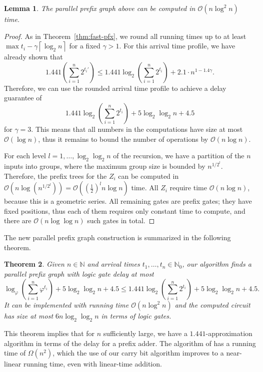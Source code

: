 \documentclass[11pt,final,microtype]{scrartcl}
\theoremstyle{plain}
\newtheorem{theorem}{Theorem}[section]
\newtheorem{lemma}[theorem]{Lemma}
\theoremstyle{definition}
\theoremstyle{remark}
\newcommand{\ceil}[1]{\left\lceil #1 \right\rceil}
\newcommand{\ld}{\log_{2}}
\begin{document}
\begin{lemma} \label{lem:rt-app}
  The parallel prefix graph above can be
  computed in $\mathcal{O}(n \log^2 n)$ time. 
\end{lemma}
\begin{proof}
  As in Theorem~\ref{thm:fast-pfx}, we round all running times up to
  at least $\max t_i - \gamma \ceil{\ld n}$ for a fixed $\gamma >
  1$. For this arrival time profile, we have already shown that
  $$1.441\left(\sum_{i=1}^n 2^{t_i'}\right)  \leq  1.441 \ld
  \left(\sum_{i=1}^n 2^{t_i}\right) + 2.1 \cdot n^{1-1.4\gamma}.$$
  Therefore, we can use the rounded arrival time profile to achieve a
  delay guarantee of 
  $$1.441 \ld
  \left(\sum_{i=1}^n 2^{t_i}\right) + 5 \ld \ld n + 4.5$$ for $\gamma
  = 3$. This means that all numbers in the computations have size at
  most $\mathcal{O}(\log n)$, thus it remains to bound the number of
  operations by $\mathcal{O}(n \log n)$. 

  For each level $l = 1, \dots, \ld \ld n$ of the recursion, we have a
  partition of the $n$ inputs into groups, where the maximum group
  size is bounded by $n^{1/2^l}$. Therefore, the prefix trees for the
  $Z_i$ can be computed in $\mathcal{O}\left(n \log
    \left(n^{1/2^l}\right)\right) =
  \mathcal{O}\left(\left(\frac{1}{2}\right)^l n\log n\right)$
  time. All $Z_i$ require time $\mathcal{O}(n \log n)$, because this
  is a geometric series. All remaining gates are prefix gates; they
  have fixed positions, thus each of them requires only constant time
  to compute, and there are $\mathcal{O}(n \log \log n)$ such gates in
  total.
\end{proof}

The new parallel prefix graph construction is summarized in the
following theorem.
\begin{theorem} \label{thm:my-ppfx} Given $n \in \mathbb{N}$ and
  arrival times $t_1, \dots, t_n \in \mathbb{N}_0$, our algorithm
  finds a parallel prefix graph with logic gate delay at most
$$\log_{\varphi} \left(\sum_{i=1}^n \varphi^{t_i}\right) + 5 \log_2 \log_2 n +
4.5 \le 1.441 \ld  \left(\sum_{i=1}^n 2^{t_i}\right) + 5 \log_2 \log_2 n +
4.5.$$
It can be implemented with running time $\mathcal{O}(n \log^2 n)$ and
the computed circuit has size at most $6 n \ld \ld n$ in terms of logic gates. 
\end{theorem}


This theorem implies that for $n$ sufficiently large, we have a
$1.441$-approximation algorithm in terms of the delay for a prefix
adder. The algorithm of \cite{bonn2} has a running time of
$\Omega(n^2)$, which the use of our carry bit algorithm improves to a
near-linear running time, even with linear-time addition.
\end{document}
